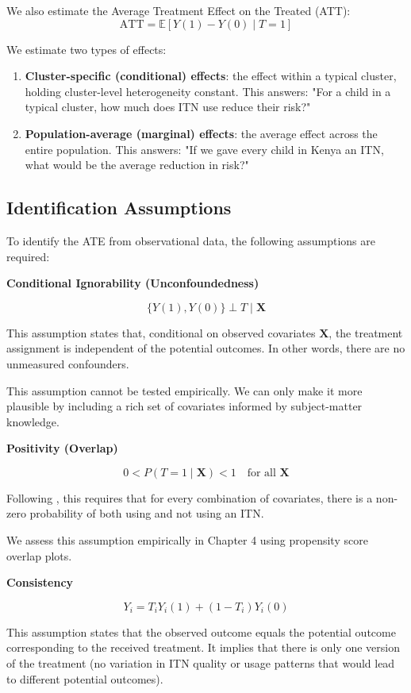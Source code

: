 We also estimate the Average Treatment Effect on the Treated (ATT):
\[
\text{ATT} = \mathbb{E}[Y(1) - Y(0) \mid T = 1]
\]

We estimate two types of effects:

\begin{enumerate}
	\item \textbf{Cluster-specific (conditional) effects}: the effect within a typical cluster, holding cluster-level heterogeneity constant. This answers: "For a child in a typical cluster, how much does ITN use reduce their risk?"
	
	\item \textbf{Population-average (marginal) effects}: the average effect across the entire population. This answers: "If we gave every child in Kenya an ITN, what would be the average reduction in risk?"
\end{enumerate}

\subsection{Identification Assumptions}

To identify the ATE from observational data, the following assumptions are required:

\textbf{Conditional Ignorability (Unconfoundedness)}

\[
\{Y(1), Y(0)\} \perp T \mid \mathbf{X}
\]

This assumption states that, conditional on observed covariates $\mathbf{X}$, the treatment assignment is independent of the potential outcomes. In other words, there are no unmeasured confounders.

This assumption cannot be tested empirically. We can only make it more plausible by including a rich set of covariates informed by subject-matter knowledge.

\textbf{Positivity (Overlap)}

\[
0 < P(T = 1 \mid \mathbf{X}) < 1 \quad \text{for all } \mathbf{X}
\]

Following \citet{westreich2010invited}, this requires that for every combination of covariates, there is a non-zero probability of both using and not using an ITN.

We assess this assumption empirically in Chapter 4 using propensity score overlap plots.

\textbf{Consistency}

\[
Y_i = T_i Y_i(1) + (1 - T_i) Y_i(0)
\]

This assumption states that the observed outcome equals the potential outcome corresponding to the received treatment. It implies that there is only one version of the treatment (no variation in ITN quality or usage patterns that would lead to different potential outcomes).

